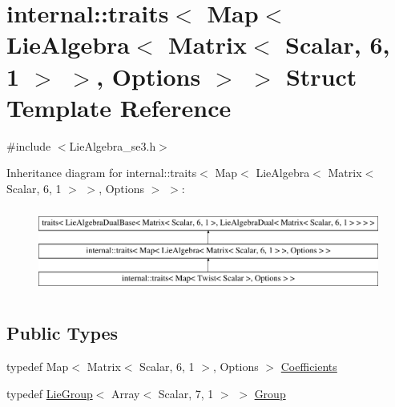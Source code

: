 \hypertarget{structinternal_1_1traits_3_01_map_3_01_lie_algebra_3_01_matrix_3_01_scalar_00_016_00_011_01_4_01_4_00_01_options_01_4_01_4}{}\section{internal\+:\+:traits$<$ Map$<$ Lie\+Algebra$<$ Matrix$<$ Scalar, 6, 1 $>$ $>$, Options $>$ $>$ Struct Template Reference}
\label{structinternal_1_1traits_3_01_map_3_01_lie_algebra_3_01_matrix_3_01_scalar_00_016_00_011_01_4_01_4_00_01_options_01_4_01_4}


{\ttfamily \#include $<$Lie\+Algebra\+\_\+se3.\+h$>$}

Inheritance diagram for internal\+:\+:traits$<$ Map$<$ Lie\+Algebra$<$ Matrix$<$ Scalar, 6, 1 $>$ $>$, Options $>$ $>$\+:\begin{figure}[H]
\begin{center}
\leavevmode
\includegraphics[height=2.857143cm]{structinternal_1_1traits_3_01_map_3_01_lie_algebra_3_01_matrix_3_01_scalar_00_016_00_011_01_4_01_4_00_01_options_01_4_01_4}
\end{center}
\end{figure}
\subsection*{Public Types}
\begin{DoxyCompactItemize}
\item 
typedef Map$<$ Matrix$<$ Scalar, 6, 1 $>$, Options $>$ \hyperlink{structinternal_1_1traits_3_01_map_3_01_lie_algebra_3_01_matrix_3_01_scalar_00_016_00_011_01_4_01_4_00_01_options_01_4_01_4_a3d1c06b436990d5476665a10fc6ec447}{Coefficients}
\item 
typedef \hyperlink{class_lie_group}{Lie\+Group}$<$ Array$<$ Scalar, 7, 1 $>$ $>$ \hyperlink{structinternal_1_1traits_3_01_map_3_01_lie_algebra_3_01_matrix_3_01_scalar_00_016_00_011_01_4_01_4_00_01_options_01_4_01_4_a13ab0b81517271df7b1e26758eb63b67}{Group}
\end{DoxyCompactItemize}


